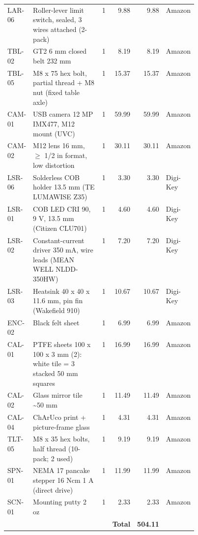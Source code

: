 \begin{tabular}{lp{0.45\linewidth}rrrl}
LAR-06 & Roller-lever limit switch, sealed, 3 wires attached (2-pack) & 1 & 9.88 & 9.88 & Amazon \\
TBL-02 & GT2 6 mm closed belt 232 mm & 1 & 8.19 & 8.19 & Amazon \\
TBL-05 & M8 x 75 hex bolt, partial thread + M8 nut (fixed table axle) & 1 & 15.37 & 15.37 & Amazon \\
CAM-01 & USB camera 12 MP IMX477, M12 mount (UVC) & 1 & 59.99 & 59.99 & Amazon \\
CAM-02 & M12 lens 16 mm, $\geq$ 1/2 in format, low distortion & 1 & 30.11 & 30.11 & Amazon \\
LSR-06 & Solderless COB holder 13.5 mm (TE LUMAWISE Z35) & 1 & 3.30 & 3.30 & Digi-Key \\
LSR-01 & COB LED CRI 90, 9 V, 13.5 mm (Citizen CLU701) & 1 & 4.60 & 4.60 & Digi-Key \\
LSR-02 & Constant-current driver 350 mA, wire leads (MEAN WELL NLDD-350HW) & 1 & 7.20 & 7.20 & Digi-Key \\
LSR-03 & Heatsink 40 x 40 x 11.6 mm, pin fin (Wakefield 910) & 1 & 10.67 & 10.67 & Digi-Key \\
ENC-02 & Black felt sheet & 1 & 6.99 & 6.99 & Amazon \\
CAL-01 & PTFE sheets 100 x 100 x 3 mm (2): white tile = 3 stacked 50 mm squares & 1 & 16.99 & 16.99 & Amazon \\
CAL-02 & Glass mirror tile \textasciitilde{}50 mm & 1 & 11.49 & 11.49 & Amazon \\
CAL-04 & ChArUco print + picture-frame glass & 1 & 4.31 & 4.31 & Amazon \\
TLT-05 & M8 x 35 hex bolts, half thread (10-pack; 2 used) & 1 & 9.19 & 9.19 & Amazon \\
SPN-01 & NEMA 17 pancake stepper 16 Ncm 1 A (direct drive) & 1 & 11.99 & 11.99 & Amazon \\
SCN-01 & Mounting putty 2 oz & 1 & 2.33 & 2.33 & Amazon \\
 & & & \textbf{Total} & \textbf{504.11} &  \\ 
\end{tabular}

